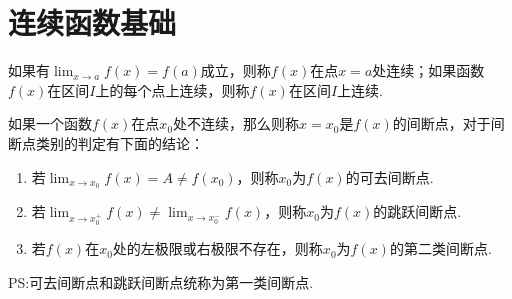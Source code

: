 \section{连续函数基础}

\begin{definition}
	如果有$\displaystyle\lim_{x\to a}f(x)=f(a)$成立，则称$f(x)$在点$x=a$处连续；如果函数$f(x)$在区间$I$上的每个点上连续，则称$f(x)$在区间$I$上连续.
\end{definition}

如果一个函数$f(x)$在点$x_0$处不连续，那么则称$x=x_0$是$f(x)$的间断点，对于间断点类别的判定有下面的结论：

\begin{proposition}[间断点的判定]
	\begin{enumerate}
		\item 若$\displaystyle\lim_{x\to x_0}f(x)=A\neq f(x_0)$，则称$x_0$为$f(x)$的可去间断点.
		\item 若$\displaystyle\lim_{x\to x_0^+}f(x)\neq\displaystyle\lim_{x\to x_0^-}f(x)$，则称$x_0$为$f(x)$的跳跃间断点.
		\item 若$f(x)$在$x_0$处的左极限或右极限不存在，则称$x_0$为$f(x)$的第二类间断点.
	\end{enumerate}
	PS:可去间断点和跳跃间断点统称为第一类间断点.
\end{proposition}